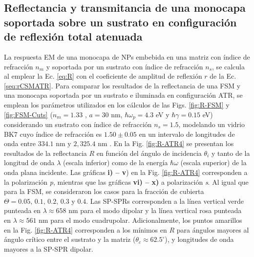 	\subsection{Reflectancia y transmitancia de una monocapa soportada sobre un sustrato en configuración de reflexión total atenuada}
	\label{ssection:DrudeATR}

La respuesta EM de una monocapa de NPs embebida en una matriz con índice de refracción $n_m$ y soportada por un sustrato con índice de refracción $n_s$, se calcula al emplear la Ec.  \eqref{eq:R} con el coeficiente de amplitud de reflexión $r$ de la Ec.  \eqref{seq:rCSMATR}. Para comparar los resultados de la reflectancia de una FSM y una monocapa soportada por un sustrato e iluminada en configuración ATR, se emplean los parámetros utilizados en los cálculos de las Figs. \ref{fig:R-FSM} y \ref{fig:FSM-Cuts} ($n_m=1.33$ , $a=30$ nm, $\hbar\omega_p=4.3$ eV y  $\hbar\gamma = 0.15$ eV) considerando un sustrato con índice de refracción $n_s=1.5$, modelando un vidrio BK7 cuyo índice de refracción es $1.50\pm 0.05$ en un intervalo de longitudes de onda entre $334.1$ nm y $2,325.4$ nm \cite{schott2019datasheet}. En la Fig.  \ref{fig:R-ATR4} se presentan los resultados de la reflectancia $R$ en función del ángulo de incidencia $\theta_i$ y tanto de la longitud de onda $\lambda$ (escala inferior) como de la energía $\hbar\omega$ (escala superior)  de la onda plana incidente. Las gráficas \textbf{i) -- v}) en la Fig. \ref{fig:R-ATR4}  corresponden a la polarización \emph{p}, mientras que las gráficas \textbf{vi) -- x)} a polarización \emph{s}. Al igual que para la FSM, se consideraron los casos para la fracción de cubierta $\Theta = 0.05,\,0.1,\,0.2,\,0.3$ y $0.4$. Las SP-SPRs corresponden a la línea vertical verde punteada en $\lambda \approx 658$ nm para el modo dipolar y la línea vertical rosa punteada en  $\lambda \approx 561$ nm para el modo cuadrupolar. Adicionalmente, los puntos amarillos en la Fig. \ref{fig:R-ATR4} corresponden a los mínimos en $R$ para ángulos mayores al ángulo crítico entre el sustrato y la matriz ($\theta_c\approx 62.5^\circ$), y longitudes de onda mayores a la SP-SPR dipolar.

